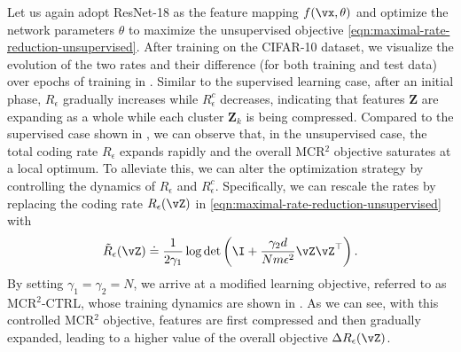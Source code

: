 \documentclass[../../book-main.tex]{subfiles}
\begin{document}
Let us again adopt ResNet-18 as the feature mapping $f(\vx,\theta)$
and optimize the network parameters $\theta$ to maximize the
unsupervised objective \eqref{eqn:maximal-rate-reduction-unsupervised}.
After training on the CIFAR-10 dataset, we visualize the evolution of
the two rates and their difference (for both training and test data)
over epochs of training in .
Similar to the supervised learning case, after an initial phase,
$R_\epsilon$ gradually increases while $R^c_\epsilon$ decreases,
indicating that features $\bm Z$ are expanding as a whole while each
cluster $\bm Z_k$ is being compressed. Compared to the supervised
case shown in , we can observe that, in the
unsupervised case, the total coding rate $R_\epsilon$ expands rapidly
and the overall MCR$^2$ objective saturates at a local optimum. To
alleviate this, we can alter the optimization strategy by controlling
the dynamics of $R_\epsilon$ and $R^c_\epsilon$. Specifically, we can
rescale the rates by replacing the coding rate $R_\epsilon(\vZ)$ in
\eqref{eqn:maximal-rate-reduction-unsupervised} with
$$\tilde{R}_\epsilon(\vZ) \doteq \frac{1}{2\gamma_1} \log \det
\left(\I + \frac{\gamma_2 d}{N m \epsilon^{2}}\vZ \vZ ^{\top}\right).$$
By setting $\gamma_1 = \gamma_2 = N$, we arrive at a modified
learning objective, referred to as MCR$^2$-{\scriptsize CTRL}, whose
training dynamics are shown in
. As we can see, with this
controlled MCR$^2$ objective, features are first compressed and then
gradually expanded, leading to a higher value of the overall
objective $\Delta R_{\epsilon}(\vZ)$.
\end{document}
